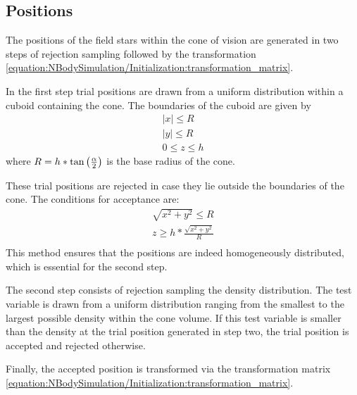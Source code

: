 \documentclass[letterpaper,10pt,english]{sphinxmanual}
\begin{document}
			
			\subsection{Positions}
				\label{\detokenize{NBodySimulation/Initialization:positions}}
				\sphinxAtStartPar
				The positions of the field stars within the cone of vision are generated in two steps of rejection sampling followed by the transformation \eqref{equation:NBodySimulation/Initialization:transformation_matrix}.
				
				\sphinxAtStartPar
				In the first step trial positions are drawn from a uniform distribution within a cuboid containing the cone.
				The boundaries of the cuboid are given by
				\begin{equation*}
				\begin{split}|x|\leq R \\
				|y|\leq R \\
				0\leq z\leq h\end{split}
				\end{equation*}
				\sphinxAtStartPar
				where \(R=h*\textup{tan}\left ( \frac{\alpha}{2} \right )\) is the base radius of the cone.
				
				\sphinxAtStartPar
				These trial positions are rejected in case they lie outside the boundaries of the cone.
				The conditions for acceptance are:
				\begin{equation*}
				\begin{split}\sqrt{x^{2}+y^{2}}\leq R \\
				z\geq h*\frac{\sqrt{x^{2}+y^{2}}}{R} \\\end{split}
				\end{equation*}
				\sphinxAtStartPar
				This method ensures that the positions are indeed homogeneously distributed, which is essential for the second step.
				
				\sphinxAtStartPar
				The second step consists of rejection sampling the density distribution.
				The test variable is drawn from a uniform distribution ranging from the smallest to the largest possible density within the cone volume.
				If this test variable is smaller than the density at the trial position generated in step two, the trial position is accepted and rejected otherwise.
				
				\sphinxAtStartPar
				Finally, the accepted position is transformed via the transformation matrix \eqref{equation:NBodySimulation/Initialization:transformation_matrix}.
				
\end{document}
